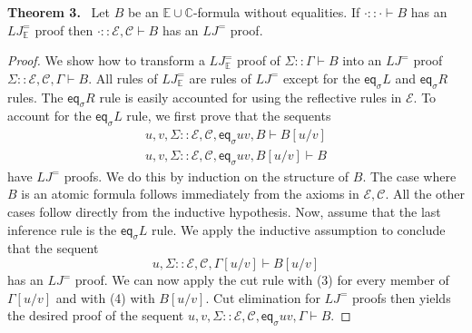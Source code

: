 \documentclass[10pt,a4paper]{article}
\newcommand{\pmLJ}{\mathit{LJ}}
\newcommand{\pmEs}{\mathbb E}\newcommand{\pmCs}{\mathbb C}
\newcommand{\pmEa}{\mathcal E}\newcommand{\pmCa}{\mathcal C}
\newcommand{\pmeq}{\mathsf{eq}}
\newcommand{\pmseq}[3]{#1\mathbin{::}#2\vdash #3}
\newcommand{\pmorig}[2]{\par\medskip\noindent\textbf{#1 #2.}\ }
\begin{document}
\pmorig{Theorem}{3} Let $B$ be an $\pmEs\cup\pmCs$-formula without equalities. If $\pmseq\cdot\cdot B$ has an $\pmLJ^=_{\pmEs}$ proof then $\pmseq\cdot{\pmEa,\pmCa}B$ has an $\pmLJ^=$ proof.

\begin{proof}
We show how to transform a $\pmLJ^=_{\pmEs}$ proof of $\pmseq\Sigma\Gamma B$ into an $\pmLJ^=$ proof $\pmseq\Sigma{\pmEa,\pmCa,\Gamma}B$. All rules of $\pmLJ^=_{\pmEs}$ are rules of $\pmLJ^=$ except for the $\pmeq_\sigma L$ and $\pmeq_\sigma R$ rules. The $\pmeq_\sigma R$ rule is easily accounted for using the reflective rules in $\pmEa$. To account for the $\pmeq_\sigma L$ rule, we first prove that the sequents
\begin{gather*}\pmseq{u,v,\Sigma}{\pmEa,\pmCa,\pmeq_\sigma u v,B}{B[u/v]}\tag{3}\\
\pmseq{u,v,\Sigma}{\pmEa,\pmCa,\pmeq_\sigma u v,B[u/v]}B\tag{4}
\end{gather*}
have $\pmLJ^=$ proofs. We do this by induction on the structure of $B$. The case where $B$ is an atomic formula follows immediately from the axioms in $\pmEa,\pmCa$. All the other cases follow directly from the inductive hypothesis.
Now, assume that the last inference rule is the $\pmeq_\sigma L$ rule. We apply the inductive assumption to conclude that the sequent
\[\pmseq{u,\Sigma}{\pmEa,\pmCa,\Gamma[u/v]}{B[u/v]}\]
has an $\pmLJ^=$ proof. We can now apply the cut rule with (3) for every member of $\Gamma[u/v]$ and with (4) with $B[u/v]$. Cut elimination for $\pmLJ^=$ proofs then yields the desired proof of the sequent $\pmseq{u,v,\Sigma}{\pmEa,\pmCa,\pmeq_\sigma u v,\Gamma}B$.
\end{proof}
\end{document}
